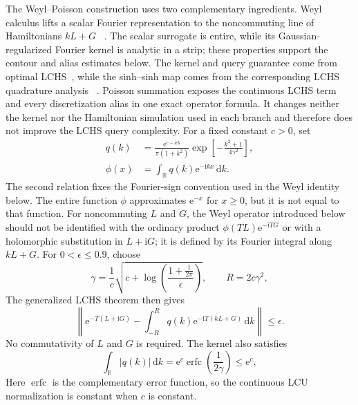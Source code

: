 \documentclass[aps,pra,reprint,floatfix,unsortedaddress,superscriptaddress]{revtex4-2}
\newcommand{\abs}[1]{\left\lvert#1\right\rvert}
\begin{document}
The Weyl--Poisson construction uses two complementary ingredients.  Weyl
calculus lifts a scalar Fourier representation to the noncommuting line
of Hamiltonians $kL+G$
~\cite{ni2026quantumeigenvaluetransformationlinear}.  The scalar
surrogate is entire, while its Gaussian-regularized Fourier kernel is
analytic in a strip; these properties support the contour and alias
estimates below.  The kernel and query guarantee come from optimal
LCHS~\cite{low2025optimalquantumsimulationlinear}, while the sinh--sinh
map comes from the corresponding LCHS quadrature analysis
~\cite{aftab2026lchsmpf}.  Poisson summation exposes the continuous LCHS
term and every discretization alias in one exact operator formula.  It
changes neither the kernel nor the Hamiltonian simulation used in each
branch and therefore does not improve the LCHS query complexity.
For a fixed constant $c>0$, set
\begin{align}
    q(k)
    &=
    \frac{\mathrm e^{c-\mathrm i c k}}{\pi(1+k^2)}
    \exp\!\left[-\frac{k^2+1}{4\gamma^2}\right],
    \nonumber\\
    \phi(x)
    &=\int_{\mathbb R}q(k)\mathrm e^{-\mathrm ikx}\,\mathrm dk.
    \label{eq:optimal_lchs_kernel}
\end{align}
The second relation fixes the Fourier-sign convention used in the
Weyl identity below.  The entire function $\phi$ approximates
$\mathrm e^{-x}$ for $x\geq0$, but it is not equal to that function.
For noncommuting $L$ and $G$, the Weyl operator introduced below should
not be identified with the ordinary product
$\phi(TL)\mathrm e^{-\mathrm iTG}$ or with a holomorphic substitution in
$L+\mathrm iG$; it is defined by its Fourier integral along $kL+G$.
For $0<\epsilon\leq0.9$, choose
\begin{equation}
    \gamma=
    \frac{1}{c}
    \sqrt{c+\log\!\left(
    \frac{1+\frac{1}{2\pi}}{\epsilon}\right)},
    \qquad
    R=2c\gamma^2,
    \label{eq:optimal_lchs_parameters}
\end{equation}
The generalized LCHS theorem then gives
\begin{equation}
    \left\|
    \mathrm e^{-T(L+\mathrm iG)}-
    \int_{-R}^{R}q(k)
    \mathrm e^{-\mathrm iT(kL+G)}\,\mathrm dk
    \right\|
    \leq\epsilon.
    \label{eq:optimal_lchs_error}
\end{equation}
No commutativity of $L$ and $G$ is required.  The kernel also satisfies
\begin{equation}
    \int_{\mathbb R}\abs{q(k)}\,\mathrm dk
    =
    \mathrm e^c\operatorname{erfc}\!\left(\frac{1}{2\gamma}\right)
    \leq \mathrm e^c,
    \label{eq:optimal_lchs_normalization}
\end{equation}
Here $\operatorname{erfc}$ is the complementary error function, so the
continuous LCU normalization is constant when $c$ is constant.
\end{document}
